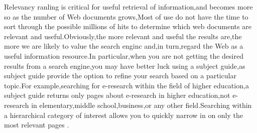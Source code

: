 \documentclass[10pt,a4paper]{book}
\begin{document}
Relevancy ranling is critical for useful retrieval of information,and becomes more so as the number of Web documents grows,Most of use do not have the time to sort through the possible millions of hits to determine which web documents are relevant and useful.Obviously,the more relevant and useful the results are,the more we are likely to value the search enginc and,in turn,regard the Web as a useful information resource.In particular,when you are not getting the desired results from a search engine,you may have better luck using a subject guide,as subject guide provide the option to refine your search based on a particular topic.For example,searching for e-research within the field of higher education,a subject guide returns only pages about e-research in higher education,not e-research in elementary,middle school,business,or any other field.Searching within a hierarchical category of interest allows you to quickly narrow in on only the most relevant pages . 
\end{document}
